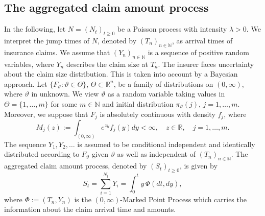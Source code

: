 \documentclass[reqno, 11pt]{amsart}%
\newcommand{\R}{\mathbb{R}}
\newcommand{\N}{\mathbb{N}}
\theoremstyle{definition}
\numberwithin{equation}{section} \numberwithin{theorem}{section}
\begin{document}
\subsection{The aggregated claim amount process}
In the following, let $N=(N_t)_{t\ge0}$ be a Poisson process with intensity $\lambda>0$.  We interpret the jump times of $N$, denoted by $(T_n)_{n\in\N}$, as arrival times of insurance claims. We assume that $(Y_n)_{n\in\N}$ is a sequence of positive random variables, where $Y_n$ describes the claim size at $T_n$.
The insurer faces uncertainty about the claim size distribution. This is taken into account by a Bayesian approach.
Let $\{F_\vartheta:\vartheta\in\Theta\}$, $\Theta\subset\R^n$, be a family of distributions on $(0,\infty)$, where $\vartheta$ in unknown. 
We view $\vartheta$ as a random variable taking values in $\Theta=\{1,\ldots,m\}$ for some $m\in\N$ and initial distribution $\pi_\vartheta(j)$, $j=1,\ldots,m$.
Moreover, we suppose that $F_j$ is absolutely continuous with density $f_j$, where
\begin{equation*}
  M_{j}(z):= \int_{(0,\infty)} e^{zy}f_j(y)dy<\infty,\quad z\in\R,\quad j=1,\ldots,m.
\end{equation*}
The sequence $Y_1,Y_2,\ldots$ is assumed to be conditional independent and identically distributed according to $F_\vartheta$ given $\vartheta$ as well as independent of $(T_n)_{n\in\N}$.
The aggregated claim amount process, denoted by $(S_t)_{t\ge0}$, is given by
\begin{equation*}
S_t = \sum_{i=1}^{N_t} Y_i = \int_0^t y\, \Phi(dt,dy),
\end{equation*}
where $\Phi:=(T_n,Y_n)$ is the $(0,\infty)$-Marked Point Process which carries the information about the claim arrival time and amounts.
\end{document}

